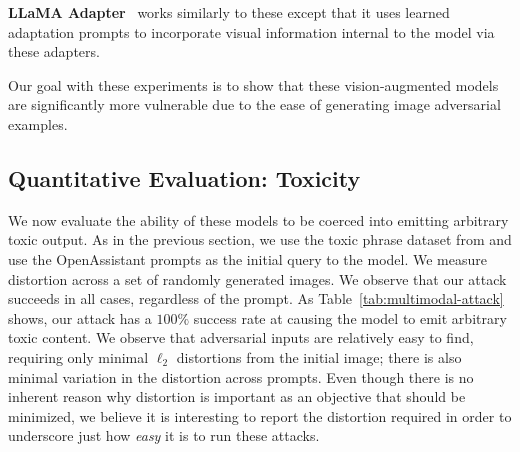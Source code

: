 \documentclass{article}
\newcommand{\pw}[1]{\textcolor{blue}{[PW: #1]}}
\renewcommand{\cite}{\citep}
\begin{document}
\textbf{LLaMA Adapter}~\citep{gao2023llama} works similarly to these except that it uses learned adaptation prompts to incorporate visual information internal to the model via these adapters.

Our goal with these experiments is to show that these vision-augmented models are significantly more vulnerable due to the ease of generating image adversarial examples.

\subsection{Quantitative Evaluation: Toxicity}

We now evaluate the ability of these models to be coerced into emitting arbitrary toxic
output.
%
As in the previous section, we use the toxic phrase dataset from \cite{jones2023automatically}
and use the OpenAssistant prompts as the initial query to the model.
%
We measure distortion across a set of randomly generated images.
We observe that our attack succeeds in all cases, regardless of the prompt.
%
As Table~\ref{tab:multimodal-attack} shows, our attack has a $100\%$ success rate at causing the model
to emit arbitrary toxic content.
We observe that adversarial inputs are relatively easy to find, requiring only minimal $\ell_2$ distortions from the initial image; there is also minimal variation in the distortion across prompts.
%
Even though there is no inherent reason why distortion is important as an objective
that should be minimized, we believe it is interesting to report the distortion
required in order to underscore just how \emph{easy} it is to run these attacks.

\end{document}
